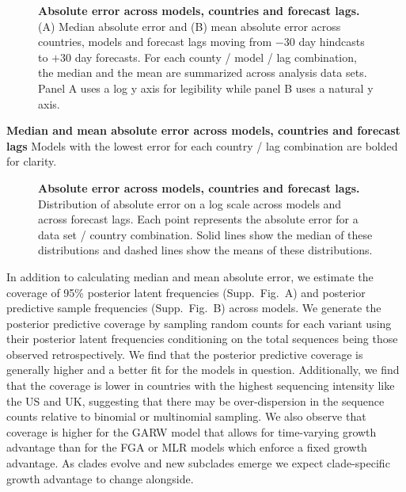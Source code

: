 \documentclass[10pt,letterpaper]{article}
\begin{document}
\begin{figure}[h!]
	\centering
	\caption{\textbf{Absolute error across models, countries and forecast lags.}
	(A) Median absolute error and (B) mean absolute error across countries, models and forecast lags moving from $-30$ day hindcasts to $+30$ day forecasts.
	For each county / model / lag combination, the median and the mean are summarized across analysis data sets.
	Panel A uses a log y axis for legibility while panel B uses a natural y axis.
	}
	\label{fig:Fig2}
\end{figure}

\begin{table}[h!]
	\centering
	\caption{
		\textbf{Median and mean absolute error across models, countries and forecast lags}
		Models with the lowest error for each country / lag combination are bolded for clarity.
	}
	\label{table:Table1}
\end{table}

\begin{figure}[tb!]
	\centering
	\caption{\textbf{Absolute error across models, countries and forecast lags.}
	Distribution of absolute error on a log scale across models and across forecast lags.
	Each point represents the absolute error for a data set / country combination.
	Solid lines show the median of these distributions and dashed lines show the means of these distributions.
	}
	\label{fig:Fig3}
\end{figure}

In addition to calculating median and mean absolute error, we estimate the coverage of 95\% posterior latent frequencies (Supp.\ Fig.\ A) and posterior predictive sample frequencies (Supp.\ Fig.\ B) across models.
We generate the posterior predictive coverage by sampling random counts for each variant using their posterior latent frequencies conditioning on the total sequences being those observed retrospectively.
We find that the posterior predictive coverage is generally higher and a better fit for the models in question.
Additionally, we find that the coverage is lower in countries with the highest sequencing intensity like the US and UK, suggesting that there may be over-dispersion in the sequence counts relative to binomial or multinomial sampling.
We also observe that coverage is higher for the GARW model that allows for time-varying growth advantage than for the FGA or MLR models which enforce a fixed growth advantage.
As clades evolve and new subclades emerge we expect clade-specific growth advantage to change alongside.
\end{document}

